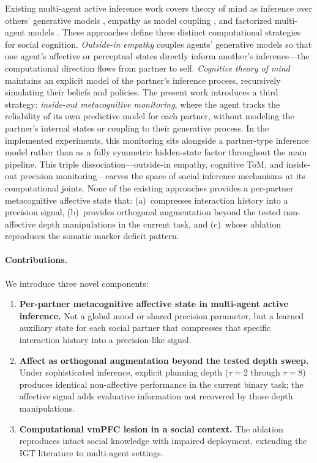 \documentclass[11pt,a4paper]{article}
\begin{document}
Existing multi-agent active inference work covers theory of mind as inference over others' generative models \citep{friston2015duet,yoshida2008game}, empathy as model coupling \citep{pitliya2025empathy,matsumura2024active}, and factorized multi-agent models \citep{ruizserra2025factorised}. These approaches define three distinct computational strategies for social cognition. \emph{Outside-in empathy} \citep{pitliya2025empathy} couples agents' generative models so that one agent's affective or perceptual states directly inform another's inference---the computational direction flows from partner to self. \emph{Cognitive theory of mind} \citep{yoshida2008game} maintains an explicit model of the partner's inference process, recursively simulating their beliefs and policies. The present work introduces a third strategy: \emph{inside-out metacognitive monitoring}, where the agent tracks the reliability of its own predictive model for each partner, without modeling the partner's internal states or coupling to their generative process. In the implemented experiments, this monitoring sits alongside a partner-type inference model rather than as a fully symmetric hidden-state factor throughout the main pipeline. This triple dissociation---outside-in empathy, cognitive ToM, and inside-out precision monitoring---carves the space of social inference mechanisms at its computational joints. None of the existing approaches provides a per-partner metacognitive affective state that: (a)~compresses interaction history into a precision signal, (b)~provides orthogonal augmentation beyond the tested non-affective depth manipulations in the current task, and (c)~whose ablation reproduces the somatic marker deficit pattern.

\paragraph{Contributions.} We introduce three novel components:
\begin{enumerate}[nosep]
  \item \textbf{Per-partner metacognitive affective state in multi-agent active inference.} Not a global mood or shared precision parameter, but a learned auxiliary state for each social partner that compresses that specific interaction history into a precision-like signal.
  \item \textbf{Affect as orthogonal augmentation beyond the tested depth sweep.} Under sophisticated inference, explicit planning depth ($\tau = 2$ through $\tau = 8$) produces identical non-affective performance in the current binary task; the affective signal adds evaluative information not recovered by those depth manipulations.
  \item \textbf{Computational vmPFC lesion in a social context.} The ablation reproduces intact social knowledge with impaired deployment, extending the IGT literature to multi-agent settings.
\end{enumerate}
\end{document}
